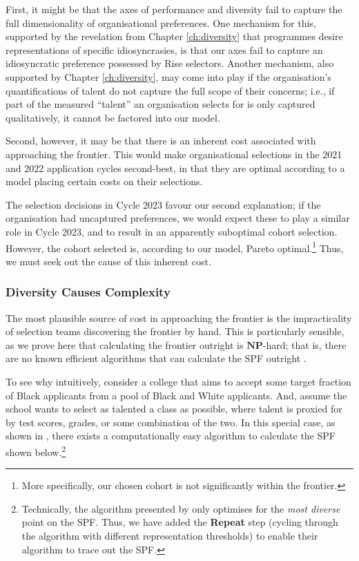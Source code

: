 First, it might be that the axes of performance and diversity fail to capture the full dimensionality of organisational preferences. One mechanism for this, supported by the revelation from Chapter \ref{ch:diversity} that programmes desire representations of specific idiosyncrasies, is that our axes fail to capture an idiosyncratic preference possessed by Rise selectors. Another mechanism, also supported by Chapter \ref{ch:diversity}, may come into play if the organisation's quantifications of talent do not capture the full scope of their concerns; i.e., if part of the measured ``talent'' an organisation selects for is only captured qualitatively, it cannot be factored into our model.

Second, however, it may be that there is an inherent cost associated with approaching the frontier. This would make organisational selections in the 2021 and 2022 application cycles second-best, in that they are optimal according to a model placing certain costs on their selections. 

The selection decisions in Cycle 2023 favour our second explanation; if the organisation had uncaptured preferences, we would expect these to play a similar role in Cycle 2023, and to result in an apparently suboptimal cohort selection. However, the cohort selected is, according to our model, Pareto optimal.\footnote{More specifically, our chosen cohort is not significantly within the frontier.} Thus, we must seek out the cause of this inherent cost.

\subsubsection{Diversity Causes Complexity}\label{subsubsec:nphard}
The most plausible source of cost in approaching the frontier is the impracticality of selection teams discovering the frontier by hand. This is particularly sensible, as we prove here that calculating the frontier outright is $\mathbf{NP}$-hard; that is, there are no known efficient algorithms that can calculate the SPF outright \cite{COPPERSMITH198527}.

To see why intuitively, consider a college that aims to accept some target fraction of Black applicants from a pool of Black and White applicants. And, assume the school wants to select as talented a class as possible, where talent is proxied for by test scores, grades, or some combination of the two. In this special case, as shown in \textcite{kleinberg2018algorithmic}, there exists a computationally easy algorithm to calculate the SPF shown below.\footnote{Technically, the algorithm presented by \textcite{kleinberg2018algorithmic} only optimises for the \emph{most diverse} point on the SPF. Thus, we have added the \textbf{Repeat} step (cycling through the algorithm with different representation thresholds) to enable their algorithm to trace out the SPF.}

